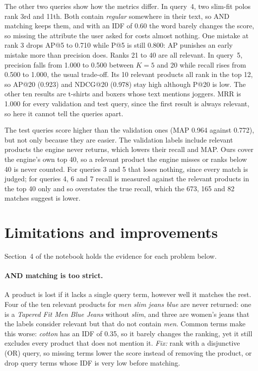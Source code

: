 \documentclass[11pt,a4paper]{article}
\begin{document}
The other two queries show how the metrics differ. In query~4, two slim-fit
polos rank 3rd and 11th. Both contain \emph{regular} somewhere in their text,
so AND matching keeps them, and with an IDF of 0.60 the word barely changes the
score, so missing the attribute the user asked for costs almost nothing. One
mistake at rank 3 drops AP@5 to 0.710 while P@5 is still 0.800: AP punishes an
early mistake more than precision does. Ranks 21 to 40 are all relevant. In query~5, precision falls from 1.000
to 0.500 between $K = 5$ and 20 while recall rises from 0.500 to 1.000, the
usual trade-off. Its 10 relevant products all rank in the top 12, so AP@20
(0.923) and NDCG@20 (0.978) stay high although P@20 is low. The other ten
results are t-shirts and boxers whose text mentions joggers. MRR is 1.000 for
every validation and test query, since the first result is always relevant, so
here it cannot tell the queries apart.

The test queries score higher than the validation ones (MAP 0.964 against
0.772), but not only because they are easier. The validation labels include
relevant products the engine never returns, which lowers their recall and MAP.
Ours cover the engine's own top 40, so a relevant product the engine misses or
ranks below 40 is never counted. For queries 3 and 5 that loses nothing, since
every match is judged; for queries 4, 6 and 7 recall is measured against the
relevant products in the top 40 only and so overstates the true recall, which
the 673, 165 and 82 matches suggest is lower.

\section{Limitations and improvements}
\label{sec:limitations}

Section~4 of the notebook holds the evidence for each problem below.

\paragraph{AND matching is too strict.} A product is lost if it lacks a single
query term, however well it matches the rest. Four of the ten relevant products
for \emph{men slim jeans blue} are never returned: one is a \emph{Tapered Fit
Men Blue Jeans} without \emph{slim}, and three are women's jeans that the
labels consider relevant but that do not contain \emph{men}. Common terms make
this worse: \emph{cotton} has an IDF of 0.35, so it barely changes the ranking,
yet it still excludes every product that does not mention it.
\emph{Fix:} rank with a disjunctive (OR) query, so missing terms lower the score
instead of removing the product, or drop query terms whose IDF is very low
before matching.
\end{document}
